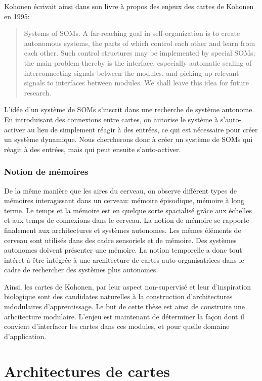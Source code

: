 \documentclass[../main]{subfiles}
\begin{document}
Kohonen écrivait ainsi dans son livre à propos des enjeux des cartes de Kohonen en 1995:
\begin{quote}Systems of SOMs. A far-reaching goal in self-organization is to create
autonomous systems, the parts of which control each other and learn from
each other. Such control structures may be implemented by special SOMs;
the main problem thereby is the interface, especially automatic scaling of
interconnecting signals between the modules, and picking up relevant signals
to interfaces between modules. We shall leave this idea for future research. \cite{Kohonen1995SelfOrganizingM}
\end{quote}
L'idée d'un système de SOMs s'inscrit dans une recherche de système autonome. En introduisant des connexions entre cartes, on autorise le système à s'auto-activer au lieu de simplement réagir à des entrées, ce qui est nécessaire pour créer un système dynamique. Nous chercherons donc à créer un système de SOMs qui réagit à des entrées, mais qui peut ensuite s'auto-activer.

\subsubsection{Notion de mémoires}

De la même manière que les aires du cerveau, on observe différent types de mémoires interagissant dans un cerveau: mémoire épisodique, mémoire à long terme. Le temps et la mémoire est en quelque sorte spacialisé grâce aux échelles et aux temps de connexions dans le cerveau. 
La notion de mémoire se rapporte finalement aux architectures et systèmes autonomes. Les mêmes éléments de cerveau sont utilisés dans des cadre sensoriels et de mémoire. 
Des systèmes autonomes doivent présenter une mémoire. 
La notion temporelle a donc tout intéret à être intégrée à une architecture de cartes auto-organisatrices dans le cadre de rechercher des systèmes plus autonomes.


Ainsi, les cartes de Kohonen, par leur aspect non-supervisé et leur d'inspiration biologique sont des candidates naturelles à la construction d'architectures mdodulaires d'apprentissage. Le but de cette thèse est ainsi de construire une arhcitecture modulaire. L'enjeu est maintenant de déterminer la façon dont il convient d'interfacer les cartes dans ces modules, et pour quelle domaine d'application. 



\section{Architectures de cartes}
\end{document}
